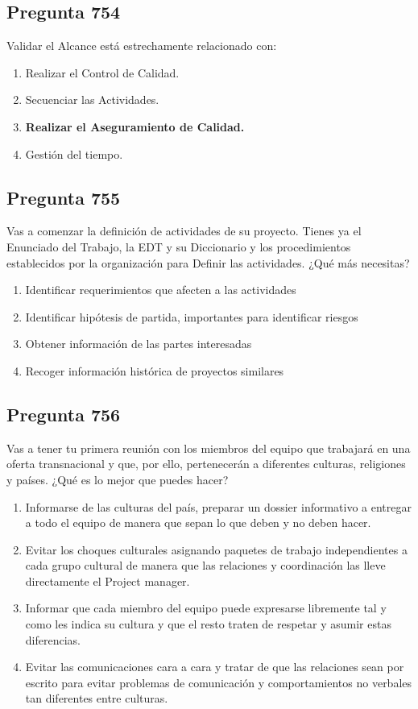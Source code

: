 \documentclass[11pt,a4paper]{article}
\begin{document}
\subsection*{Pregunta 754}
Validar el Alcance está estrechamente relacionado con:

\begin{enumerate}[label=\alph*)]
  \item Realizar el Control de Calidad.
  \item Secuenciar las Actividades.
  \item \textbf{Realizar el Aseguramiento de Calidad.}
  \item Gestión del tiempo.
\end{enumerate}

\subsection*{Pregunta 755}
Vas a comenzar la definición de actividades de su proyecto. Tienes ya el Enunciado del Trabajo, la EDT y su Diccionario y los procedimientos establecidos por la organización para Definir las actividades. ¿Qué más necesitas?

\begin{enumerate}[label=\alph*)]
  \item Identificar requerimientos que afecten a las actividades
  \item Identificar hipótesis de partida, importantes para identificar riesgos
  \item Obtener información de las partes interesadas
  \item Recoger información histórica de proyectos similares
\end{enumerate}

\subsection*{Pregunta 756}
Vas a tener tu primera reunión con los miembros del equipo que trabajará en una oferta transnacional y que, por ello, pertenecerán a diferentes culturas, religiones y países. ¿Qué es lo mejor que puedes hacer?

\begin{enumerate}[label=\alph*)]
  \item Informarse de las culturas del país, preparar un dossier informativo a entregar a todo el equipo de manera que sepan lo que deben y no deben hacer.
  \item Evitar los choques culturales asignando paquetes de trabajo independientes a cada grupo cultural de manera que las relaciones y coordinación las lleve directamente el Project manager.
  \item Informar que cada miembro del equipo puede expresarse libremente tal y como les indica su cultura y que el resto traten de respetar y asumir estas diferencias.
  \item Evitar las comunicaciones cara a cara y tratar de que las relaciones sean por escrito para evitar problemas de comunicación y comportamientos no verbales tan diferentes entre culturas.
\end{enumerate}
\end{document}
